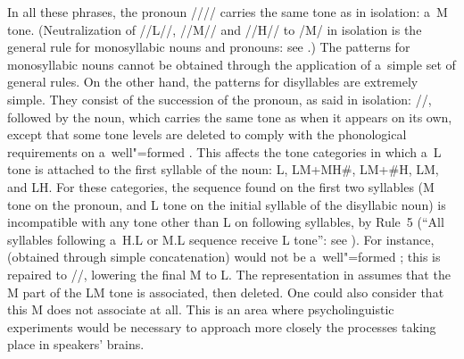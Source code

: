 \newpage 
In all these phrases, the pronoun //// carries the same tone as in isolation: a~M tone. (Neutralization of //L//, \mbox{//M//} and //H// to /M/ in isolation is the general rule for {monosyllabic} nouns and pronouns: see .) The patterns for
monosyllabic nouns cannot be obtained through the application of a~simple set of general rules. On
the other hand, the patterns for disyllables are extremely simple. They consist of the succession of
the pronoun, as said in isolation: //, followed by the noun, which carries the same tone
as when it appears on its own, except that some tone levels are deleted to comply with the phonological
requirements on a~well"=formed . This affects the tone categories in which a~L tone is
attached to the first syllable of the noun: L, LM+MH\#, LM+\#H, LM, and LH. For these categories, the sequence
found on the first two syllables (M tone on the pronoun, and L tone on the initial syllable of the
disyllabic noun) is incompatible with any tone other than L on following syllables, by Rule~5
(“All syllables following a~H.L or M.L sequence receive L tone”: see ). For instance, 
(obtained through simple concatenation) would not be a~well"=formed ; this is repaired to
//, lowering the final M to L. The representation in  assumes that the M part of the LM tone is associated, then deleted. One could also consider that this M does not associate at all. This is an area where psycholinguistic experiments would be necessary to approach more closely the processes taking place in speakers' brains.

